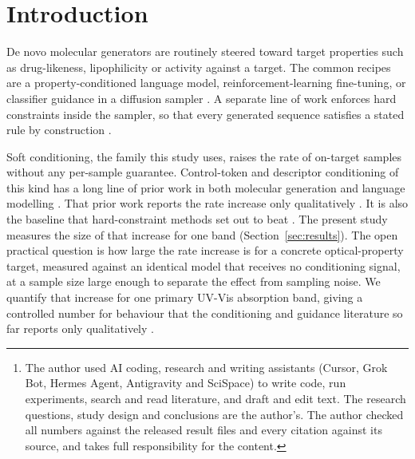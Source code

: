 \documentclass[11pt]{article}
\begin{document}
\begin{abstract}
validity $1.000$, novelty $1.000$, uniqueness $0.950 \pm 0.010$, structural-screen pass rate
$0.983 \pm 0.004$, and internal diversity $0.799 \pm 0.010$. All property values remain
surrogate predictions, not experimental measurements. Code and evaluation artifacts are
public.\footnote{The author used AI coding,
research and writing assistants (Cursor, Grok Bot, Hermes Agent, Antigravity and SciSpace) to write
code, run experiments, search and read literature, and draft and edit text. The research questions,
study design and conclusions are the author's. The author checked all numbers against the released
result files and every citation against its source, and takes full responsibility for the content.}
\end{abstract}

\section{Introduction}

De novo molecular generators are routinely steered toward target properties such as
drug-likeness, lipophilicity or activity against a target. The common recipes are a
property-conditioned language model, reinforcement-learning fine-tuning, or classifier
guidance in a diffusion sampler \cite{blaschke2020reinvent, wang2021mcmg, vignac2023digress}.
A separate line of work enforces hard constraints inside the sampler, so that every
generated sequence satisfies a stated rule by construction
\cite{cardei2025cdd, christopher2025nsd}.

Soft conditioning, the family this study uses, raises the rate of on-target samples
without any per-sample guarantee. Control-token and descriptor conditioning of this kind
has a long line of prior work in both molecular generation and language modelling
\cite{segler2018generating, kotsias2020steering, keskar2019ctrl, wang2021mcmg}. That prior
work reports the rate increase only qualitatively \cite{wang2021mcmg, vignac2023digress}. It
is also the baseline that hard-constraint methods set out to beat
\cite{cardei2025cdd, christopher2025nsd}.
The present study measures the size of that increase for one band (Section~\ref{sec:results}).
The open practical question is how large the rate increase is for a concrete
optical-property target, measured against an identical model that receives no conditioning
signal, at a sample size large enough to separate the effect from sampling noise. We
quantify that increase for one primary UV-Vis absorption band, giving a controlled number
for behaviour that the conditioning and guidance literature so far reports only
qualitatively \cite{wang2021mcmg, vignac2023digress}.
\end{document}
